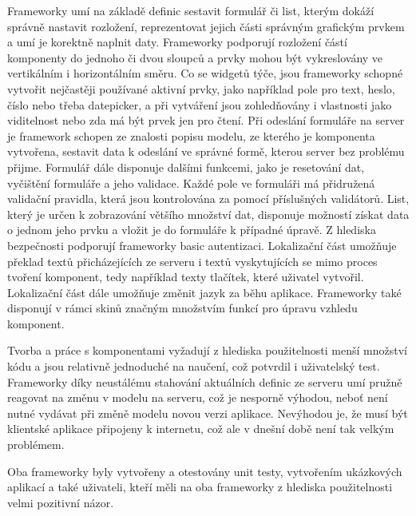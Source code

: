 Frameworky umí na základě definic sestavit formulář či list, kterým dokáží správně nastavit rozložení, reprezentovat jejich části správným grafickým prvkem a umí je korektně naplnit daty. Frameworky podporují rozložení částí komponenty do jednoho či dvou sloupců a prvky mohou být vykreslovány ve vertikálním i horizontálním směru. Co se widgetů týče, jsou frameworky schopné vytvořit nejčastěji používané aktivní prvky, jako například pole pro text, heslo, číslo nebo třeba datepicker, a při vytváření jsou zohledňovány i vlastnosti jako viditelnost nebo zda má být prvek jen pro čtení. Při odeslání formuláře na server je framework schopen ze znalosti popisu modelu, ze kterého je komponenta vytvořena, sestavit data k odeslání ve správné formě, kterou server bez problému přijme. Formulář dále disponuje dalšími funkcemi, jako je resetování dat, vyčištění formuláře a jeho validace. Každé pole ve formuláři má přidružená validační pravidla, která jsou kontrolována za pomocí příslušných validátorů. List, který je určen k zobrazování většího množství dat, disponuje možností získat data o jednom jeho prvku a vložit je do formuláře k případné úpravě. Z hlediska bezpečnosti podporují frameworky basic autentizaci. Lokalizační část umožňuje překlad textů přicházejících ze serveru i textů vyskytujících se mimo proces tvoření komponent, tedy například texty tlačítek, které uživatel vytvořil. Lokalizační část dále umožňuje změnit jazyk za běhu aplikace. Frameworky také disponují v rámci skinů značným množstvím funkcí pro úpravu vzhledu komponent.

Tvorba a práce s komponentami vyžadují z hlediska použitelnosti menší množství kódu a jsou relativně jednoduché na naučení, což potvrdil i uživatelský test. Frameworky díky neustálému stahování aktuálních definic ze serveru umí pružně reagovat na změnu v modelu na serveru, což je nesporně výhodou, neboť není nutné vydávat při změně modelu novou verzi aplikace. Nevýhodou je, že musí být klientské aplikace připojeny k internetu, což ale v dnešní době není tak velkým problémem. 

Oba frameworky byly vytvořeny a otestovány unit testy, vytvořením ukázkových aplikací a také uživateli, kteří měli na oba frameworky z hlediska použitelnosti velmi pozitivní názor.